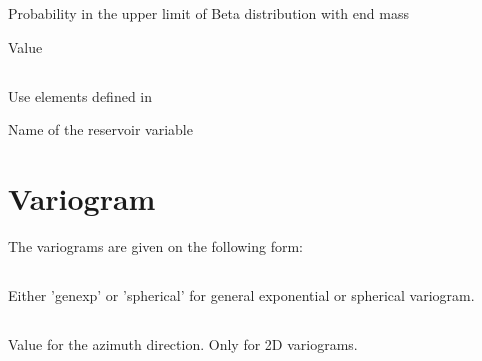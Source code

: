 {\subsubsection{}
 \slist
   \item \Description Probability in the upper limit of Beta distribution with end mass
   \item \Argument Value
   \item \Default
 \elist

\subsection{}
 \slist
   \item \Description Use elements defined in 
   \item \Argument Name of the reservoir variable
   \item \Default 
 \elist

\section{Variogram}
\label{sec:variogram}
  The variograms are given on the following form:

\subsection{}
 \slist
   \item \Description Either 'genexp' or 'spherical' for general exponential or spherical variogram.
   \item \Argument
   \item \Default
 \elist

\subsection{}
 \slist
   \item \Description Value for the azimuth direction. Only for 2D variograms.
   \item \Argument
   \item \Default
 \elist

}
